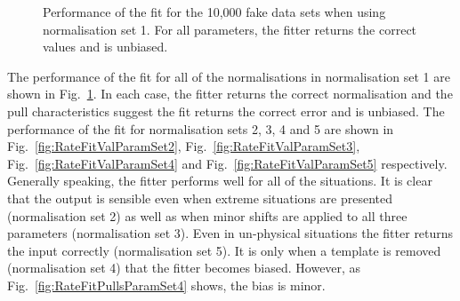 \begin{figure}%
  \centering
  \hspace{1em}
  \caption{Performance of the fit for the 10,000 fake data sets when using normalisation set 1.  For all parameters, the fitter returns the correct values and is unbiased.}
  \label{fig:RateFitValParamSet1}
\end{figure}
The performance of the fit for all of the normalisations in normalisation set 1 are shown in Fig.~\ref{fig:RateFitValParamSet1}.  In each case, the fitter returns the correct normalisation and the pull characteristics suggest the fit returns the correct error and is unbiased.  The performance of the fit for normalisation sets 2, 3, 4 and 5 are shown in Fig.~\ref{fig:RateFitValParamSet2}, Fig.~\ref{fig:RateFitValParamSet3}, Fig.~\ref{fig:RateFitValParamSet4} and Fig.~\ref{fig:RateFitValParamSet5} respectively.  Generally speaking, the fitter performs well for all of the situations.  It is clear that the output is sensible even when extreme situations are presented (normalisation set 2) as well as when minor shifts are applied to all three parameters (normalisation set 3).  Even in un-physical situations the fitter returns the input correctly (normalisation set 5).  It is only when a template is removed (normalisation set 4) that the fitter becomes biased.  However, as Fig.~\ref{fig:RateFitPullsParamSet4} shows, the bias is minor.
